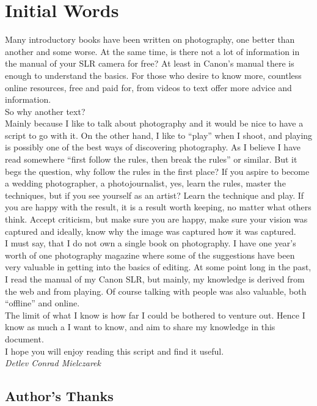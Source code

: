 \chapter*{Initial Words}


Many introductory books have been written on photography, one better than another and some worse. At the same time, is there not a lot of information in the manual of your SLR camera for free? At least in Canon's manual there is enough to understand the basics. For those who desire to know more, countless online resources, free and paid for, from videos to text offer more advice and information.
\\[\baselineskip]
So why another text?
\\
Mainly because I like to talk about photography and it would be nice to have a script to go with it. On the other hand, I like to ``play'' when I shoot, and playing is possibly one of the best ways of discovering photography. As I believe I have read somewhere ``first follow the rules, then break the rules'' or similar. 
But it begs the question, why follow the rules in the first place? If you aspire to become a wedding photographer, a photojournalist, yes, learn the rules, master the techniques, but if you see yourself as an artist? Learn the technique and play. If you are happy with the result, it is a result worth keeping, no matter what others think. Accept criticism, but make sure you are happy, make sure your vision was captured and ideally, know why the image was captured how it was captured.
\\[\baselineskip]
I must say, that I do not own a single book on photography. I have one year's worth of one photography magazine where some of the suggestions have been very valuable in getting into the basics of editing. At some point long in the past, I read the manual of my Canon SLR, but mainly, my knowledge is derived from the web and from playing. Of course talking with people was also valuable, both ``offline'' and online.
\\
The limit of what I know is how far I could be bothered to venture out. Hence I know as much a I want to know, and aim to share my knowledge in this document.
\\[\baselineskip]
I hope you will enjoy reading this script and find it useful.
\\[\baselineskip]
\textit{Detlev Conrad Mielczarek}


\section*{Author's Thanks}

